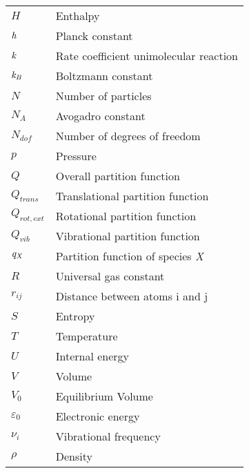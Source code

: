 \begin{longtable}{p{} p{}}
$ H $ & Enthalpy\\
$\it{h}$ & Planck constant\\
$ \it{k} $ & Rate coefficient unimolecular reaction\\ 
$ \it{k}_{B} $ & Boltzmann constant\\
$ N $ & Number of particles\\
$ N_{A} $ & Avogadro constant \\
$ N_{dof} $ & Number of degrees of freedom \\
$ p $ & Pressure\\
$ Q $ & Overall partition function\\
$ Q_{trans} $ & Translational partition function \\
$ Q_{rot,ext} $ & Rotational partition function \\
$ Q_{vib} $ & Vibrational partition function \\
$ \it{q_X} $ & Partition function of species \it{X}\\
$ R $ & Universal gas constant \\
$ r_{ij} $ & Distance between atoms i and j\\
$ S $ & Entropy\\
$ T $ & Temperature \\
$ U $ & Internal energy\\
$ V $ & Volume\\
$ V_0 $ & Equilibrium Volume\\
$ \varepsilon_0 $ & Electronic energy \\
$ \nu_{i}$ & Vibrational frequency \\ 
$ \rho $ & Density\\ \hline

\end{longtable}

